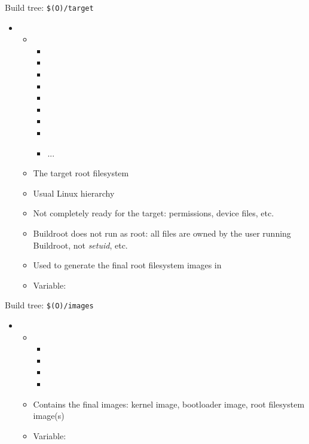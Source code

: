 \begin{frame}{Build tree: {\tt \$(O)/target}}
  \begin{itemize}
  \item {}
    \begin{itemize}
    \item {}
      \begin{itemize}
        \tiny
      \item {}
      \item {}
      \item {}
      \item {}
      \item {}
      \item {}
      \item {}
      \item {}
      \item ...
      \end{itemize}
    \item The target root filesystem
    \item Usual Linux hierarchy
    \item Not completely ready for the target: permissions, device
      files, etc.
    \item Buildroot does not run as root: all files are owned by the
      user running Buildroot, not {\em setuid}, etc.
    \item Used to generate the final root filesystem images in
    \item Variable: 
    \end{itemize}
  \end{itemize}
\end{frame}

\begin{frame}{Build tree: {\tt \$(O)/images}}
  \begin{itemize}
  \item {}
    \begin{itemize}
    \item {}
      \begin{itemize}
        \scriptsize
      \item {}
      \item {}
      \item {}
      \item {}
      \end{itemize}
    \item Contains the final images: kernel image, bootloader image,
      root filesystem image(s)
    \item Variable: 
    \end{itemize}
  \end{itemize}
\end{frame}

